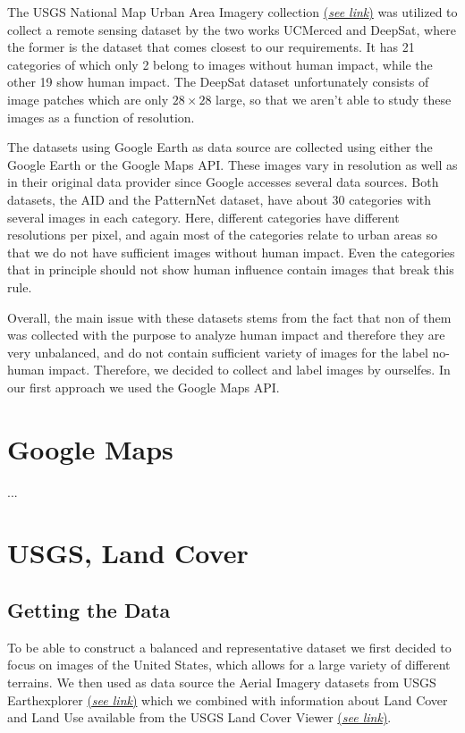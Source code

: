 The USGS National Map Urban Area Imagery collection \href{https://earthexplorer.usgs.gov/}{(\textit{see link})} was utilized to collect a remote sensing dataset by the two works UCMerced and DeepSat, where the former is the dataset that comes closest to our requirements. It has 21 categories of which only 2 belong to images without human impact, while the other 19 show human impact. The DeepSat dataset unfortunately consists of image patches which are only $28 \times 28$ large, so that we aren't able to study these images as a function of resolution.

The datasets using Google Earth as data source are collected using either the Google Earth or the Google Maps API. These images vary in resolution as well as in their original data provider since Google accesses several data sources. 
Both datasets, the AID and the PatternNet dataset, have about 30 categories with several images in each category. Here, different categories have different resolutions per pixel, and again most of the categories relate to urban areas so that we do not have sufficient images without human impact. Even the categories that in principle should not show human influence contain images that break this rule.

Overall, the main issue with these datasets stems from the fact that non of them was collected with the purpose to analyze human impact and therefore they are very unbalanced, and do not contain sufficient variety of images for the  label no-human impact. Therefore, we decided to collect and label images by ourselfes. In our first approach we used the Google Maps API.

\section{Google Maps}

...

\section{USGS, Land Cover}

\subsection{Getting the Data}
To be able to construct a balanced and representative dataset we first decided to focus on images of the United States, which allows for a large variety of different terrains. We then used as data source the Aerial Imagery datasets from USGS Earthexplorer \href{https://earthexplorer.usgs.gov/}{(\textit{see link})} which we combined with information about Land Cover and Land Use available from the USGS Land Cover Viewer \href{https://gis1.usgs.gov/csas/gap/viewer/land_cover/Map.aspx}{(\textit{see link})}.

